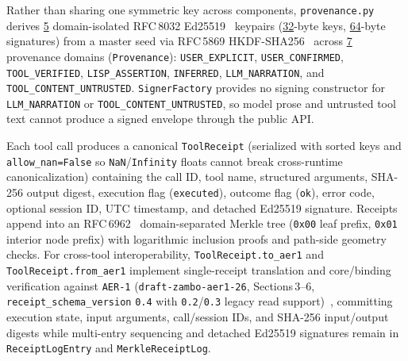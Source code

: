 \documentclass[10pt,twocolumn]{article}
\begin{document}
Rather than sharing one symmetric key across components, \texttt{provenance.py} derives \href{https://github.com/AlienatedAliens/epistemic-guard/blob/v0.5.2/results/table1_architecture.json\#L14}{5} domain-isolated RFC\,8032 Ed25519~\cite{josefsson2017rfc8032} keypairs (\href{https://github.com/AlienatedAliens/epistemic-guard/blob/v0.5.2/results/table1_architecture.json\#L9}{32}-byte keys, \href{https://github.com/AlienatedAliens/epistemic-guard/blob/v0.5.2/results/table1_architecture.json\#L10}{64}-byte signatures) from a master seed via RFC\,5869 HKDF-SHA256~\cite{krawczyk2010rfc5869} across \href{https://github.com/AlienatedAliens/epistemic-guard/blob/v0.5.2/results/table1_architecture.json\#L28}{7} provenance domains (\texttt{Provenance}): \texttt{USER\_\allowbreak EXPLICIT}, \texttt{USER\_\allowbreak CONFIRMED}, \texttt{TOOL\_\allowbreak VERIFIED}, \texttt{LISP\_\allowbreak ASSERTION}, \texttt{INFERRED}, \texttt{LLM\_\allowbreak NARRATION}, and \texttt{TOOL\_\allowbreak CONTENT\_\allowbreak UNTRUSTED}. \texttt{Signer\allowbreak Factory} provides no signing constructor for \texttt{LLM\_\allowbreak NARRATION} or \texttt{TOOL\_\allowbreak CONTENT\_\allowbreak UNTRUSTED}, so model prose and untrusted tool text cannot produce a signed envelope through the public API.

Each tool call produces a canonical \texttt{Tool\allowbreak Receipt} (serialized with sorted keys and \texttt{allow\_nan=False} so \texttt{NaN}/\texttt{Infinity} floats cannot break cross-runtime canonicalization) containing the call ID, tool name, structured arguments, SHA-256 output digest, execution flag (\texttt{executed}), outcome flag (\texttt{ok}), error code, optional session ID, UTC timestamp, and detached Ed25519 signature. Receipts append into an RFC\,6962~\cite{laurie2013rfc6962} domain-separated Merkle tree (\texttt{0x00} leaf prefix, \texttt{0x01} interior node prefix) with logarithmic inclusion proofs and path-side geometry checks. For cross-tool interoperability, \texttt{Tool\allowbreak Receipt.\allowbreak to\_\allowbreak aer1} and \texttt{Tool\allowbreak Receipt.\allowbreak from\_\allowbreak aer1} implement single-receipt translation and core/binding verification against \texttt{AER-1} (\texttt{draft-zambo-aer1-26}, Sections\,3--6, \texttt{receipt\_\allowbreak schema\_\allowbreak version} \texttt{0.4} with \texttt{0.2}/\texttt{0.3} legacy read support)~\cite{zambo2026aer1}, committing execution state, input arguments, call/session IDs, and SHA-256 input/output digests while multi-entry sequencing and detached Ed25519 signatures remain in \texttt{Receipt\allowbreak Log\allowbreak Entry} and \texttt{Merkle\allowbreak Receipt\allowbreak Log}.
\end{document}
